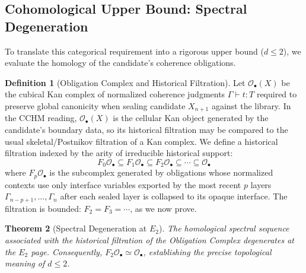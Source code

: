 \documentclass[11pt,a4paper]{article}
\theoremstyle{plain}
\newtheorem{theorem}{Theorem}[section]
\theoremstyle{definition}
\newtheorem{definition}[theorem]{Definition}
\theoremstyle{remark}
\begin{document}
\subsection{Cohomological Upper Bound: Spectral Degeneration}
\label{sec:spectral-upper}

To translate this categorical requirement into a rigorous upper bound ($d \le 2$), we evaluate the homology of the candidate's coherence obligations.

\begin{definition}[Obligation Complex and Historical Filtration]
Let $\mathcal{O}_\bullet(X)$ be the cubical Kan complex of normalized coherence judgments $\Gamma \vdash t : T$ required to preserve global canonicity when sealing candidate $X_{n+1}$ against the library.
In the CCHM reading, $\mathcal{O}_\bullet(X)$ is the cellular Kan object generated by the candidate's boundary data, so its historical filtration may be compared to the usual skeletal/Postnikov filtration of a Kan complex.
We define a historical filtration indexed by the arity of irreducible historical support:
\begin{equation}
    F_0 \mathcal{O}_\bullet \subseteq F_1 \mathcal{O}_\bullet \subseteq F_2 \mathcal{O}_\bullet \subseteq \cdots \subseteq \mathcal{O}_\bullet
\end{equation}
where $F_p \mathcal{O}_\bullet$ is the subcomplex generated by obligations whose normalized contexts use only interface variables exported by the most recent $p$ layers $\Gamma_{n-p+1}, \ldots, \Gamma_n$ after each sealed layer is collapsed to its opaque interface.
The filtration is bounded: $F_2 = F_3 = \cdots$, as we now prove.
\end{definition}

\begin{theorem}[Spectral Degeneration at $E_2$]
\label{thm:spectral-degeneracy}
The homological spectral sequence associated with the historical filtration of the Obligation Complex degenerates at the $E_2$ page. Consequently, $F_2 \mathcal{O}_\bullet \simeq \mathcal{O}_\bullet$, establishing the precise topological meaning of $d \le 2$.
\end{theorem}
\end{document}
